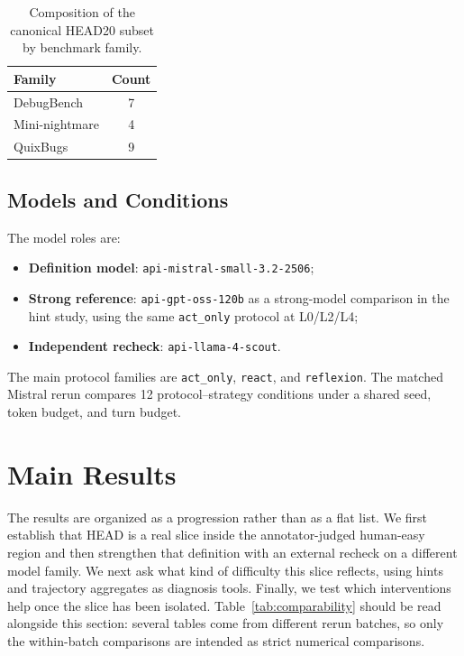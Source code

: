 \documentclass{article}
\begin{document}
\begin{table}[t]
\centering
\caption{Composition of the canonical HEAD20 subset by benchmark family.}
\label{tab:headcomposition}
\begin{tabular}{lc}
\toprule
Family & Count \\
\midrule
DebugBench & 7 \\
Mini-nightmare & 4 \\
QuixBugs & 9 \\
\bottomrule
\end{tabular}
\end{table}

\subsection{Models and Conditions}

The model roles are:
\begin{itemize}
    \item \textbf{Definition model}: \texttt{api-mistral-small-3.2-2506};
    \item \textbf{Strong reference}: \texttt{api-gpt-oss-120b} as a strong-model comparison in the hint study, using the same \texttt{act\_only} protocol at L0/L2/L4;
    \item \textbf{Independent recheck}: \texttt{api-llama-4-scout}.
\end{itemize}

The main protocol families are \texttt{act\_only}, \texttt{react}, and \texttt{reflexion}. The matched Mistral rerun compares 12 protocol--strategy conditions under a shared seed, token budget, and turn budget.

\section{Main Results}

The results are organized as a progression rather than as a flat list. We first establish that HEAD is a real slice inside the annotator-judged human-easy region and then strengthen that definition with an external recheck on a different model family. We next ask what kind of difficulty this slice reflects, using hints and trajectory aggregates as diagnosis tools. Finally, we test which interventions help once the slice has been isolated. Table~\ref{tab:comparability} should be read alongside this section: several tables come from different rerun batches, so only the within-batch comparisons are intended as strict numerical comparisons.
\end{document}
